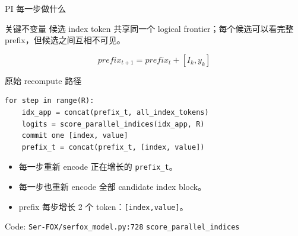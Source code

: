 \documentclass[aspectratio=169,10pt]{ctexbeamer}
\begin{document}
\begin{frame}{PI 每一步做什么}
  \begin{center}
  \end{center}

  \vspace{0.4em}
  \begin{block}{关键不变量}
    候选 index token 共享同一个 logical frontier；每个候选可以看完整 prefix，但候选之间互相不可见。
  \end{block}

  \[
    prefix_{t+1}=prefix_t + [I_k, y_k]
  \]
\end{frame}

\begin{frame}[fragile]{原始 recompute 路径}
  \begin{lstlisting}
for step in range(R):
    idx_app = concat(prefix_t, all_index_tokens)
    logits = score_parallel_indices(idx_app, R)
    commit one [index, value]
    prefix_t = concat(prefix_t, [index, value])
  \end{lstlisting}

  \begin{itemize}
    \item 每一步重新 encode 正在增长的 \texttt{prefix\_t}。
    \item 每一步也重新 encode 全部 candidate index block。
    \item prefix 每步增长 2 个 token：\texttt{[index,value]}。
  \end{itemize}

  \vfill
  \small Code: \texttt{Ser-FOX/serfox\_model.py:728} \quad \texttt{score\_parallel\_indices}
\end{frame}
\end{document}
